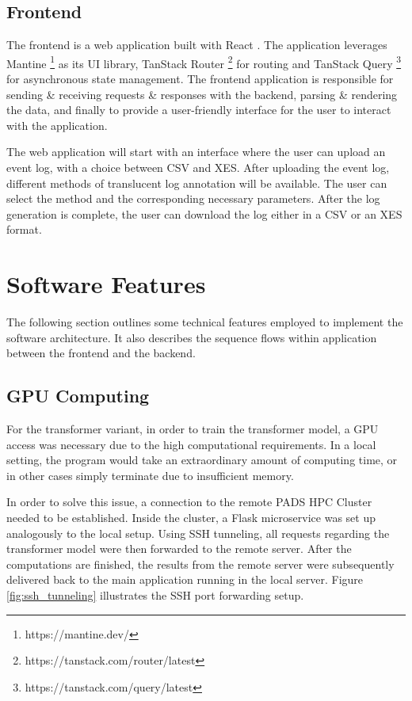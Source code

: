 \subsection{Frontend}

The frontend is a web application built with React \cite{react}. The application leverages Mantine \footnote{https://mantine.dev/} as its UI library, TanStack Router \footnote{https://tanstack.com/router/latest} for routing and TanStack Query \footnote{https://tanstack.com/query/latest} for asynchronous state management. The frontend application is responsible for sending \& receiving requests \& responses with the backend, parsing \& rendering the data, and finally to provide a user-friendly interface for the user to interact with the application.

The web application will start with an interface where the user can upload an event log, with a choice between CSV and XES. After uploading the event log, different methods of translucent log annotation will be available. The user can select the method and the corresponding necessary parameters. After the log generation is complete, the user can download the log either in a CSV or an XES format.

\section{Software Features}

The following section outlines some technical features employed to implement the software architecture. It also describes the sequence flows within application between the frontend and the backend.

\subsection{GPU Computing}
For the transformer variant, in order to train the transformer model, a GPU access was necessary due to the high computational requirements. In a local setting, the program would take an extraordinary amount of computing time, or in other cases simply terminate due to insufficient memory.

In order to solve this issue, a connection to the remote PADS HPC Cluster needed to be established. Inside the cluster, a Flask microservice was set up analogously to the local setup. Using SSH tunneling, all requests regarding the transformer model were then forwarded to the remote server. After the computations are finished, the results from the remote server were subsequently delivered back to the main application running in the local server. Figure \ref{fig:ssh_tunneling} illustrates the SSH port forwarding setup.


